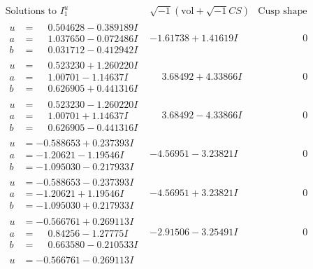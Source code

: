 \documentclass[1p]{elsarticle_modified}
\theoremstyle{definition}
\newcommand{\I}{\sqrt{-1}}
\begin{document}
$$\begin{array}{c|c|c}
\text{Solutions to }I^u_{1}& \I (\text{vol} + \sqrt{-1}CS) & \text{Cusp shape}\\
 \hline 
\begin{aligned}
u &= \phantom{-}0.504628 - 0.389189 I \\
a &= \phantom{-}1.037650 - 0.072486 I \\
b &= \phantom{-}0.031712 - 0.412942 I\end{aligned}
 & -1.61738 + 1.41619 I & \phantom{-0.000000 } 0 \\ \hline\begin{aligned}
u &= \phantom{-}0.523230 + 1.260220 I \\
a &= \phantom{-}1.00701 - 1.14637 I \\
b &= \phantom{-}0.626905 + 0.441316 I\end{aligned}
 & \phantom{-}3.68492 + 4.33866 I & \phantom{-0.000000 } 0 \\ \hline\begin{aligned}
u &= \phantom{-}0.523230 - 1.260220 I \\
a &= \phantom{-}1.00701 + 1.14637 I \\
b &= \phantom{-}0.626905 - 0.441316 I\end{aligned}
 & \phantom{-}3.68492 - 4.33866 I & \phantom{-0.000000 } 0 \\ \hline\begin{aligned}
u &= -0.588653 + 0.237393 I \\
a &= -1.20621 - 1.19546 I \\
b &= -1.095030 - 0.217933 I\end{aligned}
 & -4.56951 - 3.23821 I & \phantom{-0.000000 } 0 \\ \hline\begin{aligned}
u &= -0.588653 - 0.237393 I \\
a &= -1.20621 + 1.19546 I \\
b &= -1.095030 + 0.217933 I\end{aligned}
 & -4.56951 + 3.23821 I & \phantom{-0.000000 } 0 \\ \hline\begin{aligned}
u &= -0.566761 + 0.269113 I \\
a &= \phantom{-}0.84256 - 1.27775 I \\
b &= \phantom{-}0.663580 - 0.210533 I\end{aligned}
 & -2.91506 - 3.25491 I & \phantom{-0.000000 } 0 \\ \hline\begin{aligned}
u &= -0.566761 - 0.269113 I \\

\end{aligned}
\end{array}$$
\end{document}
